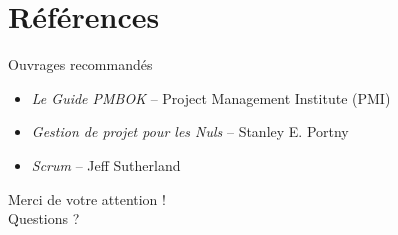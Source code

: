 \documentclass[11pt]{beamer}
\begin{document}
\section*{Références}
\begin{frame}{Ouvrages recommandés}
  \pause
  \begin{itemize}
    \item \textit{Le Guide PMBOK} – Project Management Institute (PMI) \pause
    \item \textit{Gestion de projet pour les Nuls} – Stanley E. Portny \pause
    \item \textit{Scrum} – Jeff Sutherland
  \end{itemize}
\end{frame}

\begin{frame}[plain]
  \begin{center}
    {\Huge Merci de votre attention !}\\[1em]
    {\LARGE Questions ?}
  \end{center}
\end{frame}
\end{document}
